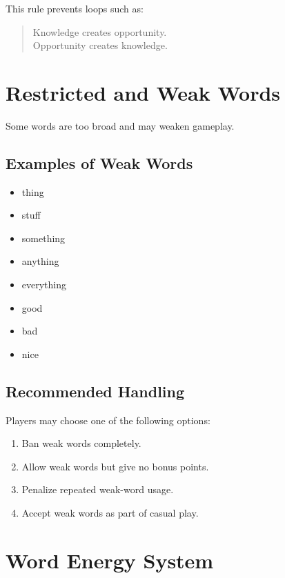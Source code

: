 \documentclass[11pt,a4paper]{article}
\begin{document}
This rule prevents loops such as:

\begin{quote}
Knowledge creates opportunity.\\
Opportunity creates knowledge.
\end{quote}

\section{Restricted and Weak Words}

Some words are too broad and may weaken gameplay.

\subsection{Examples of Weak Words}

\begin{itemize}
    \item thing
    \item stuff
    \item something
    \item anything
    \item everything
    \item good
    \item bad
    \item nice
\end{itemize}

\subsection{Recommended Handling}

Players may choose one of the following options:

\begin{enumerate}
    \item Ban weak words completely.
    \item Allow weak words but give no bonus points.
    \item Penalize repeated weak-word usage.
    \item Accept weak words as part of casual play.
\end{enumerate}

\section{Word Energy System}
\end{document}

